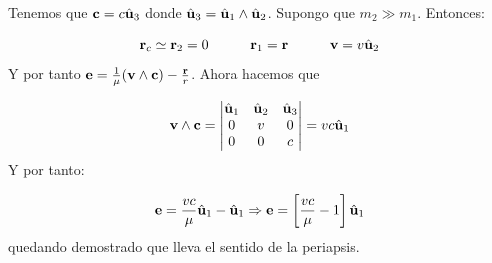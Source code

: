 \begin{texercise}
	Tenemos que $\mathbf{c}=c\hat{\mathbf{u}}_3$ donde $\hat{\mathbf{u}}_3=\hat{\mathbf{u}}_1\wedge\hat{\mathbf{u}}_2$. Supongo que $m_2\gg m_1$. Entonces:

	\begin{equation}
		\mathbf{r}_c \simeq \mathbf{r}_2 = 0 \quad \quad \quad \mathbf{r}_1 = \mathbf{r} \quad \quad \quad \mathbf{v} = v \hat{\mathbf{u}}_2
	\end{equation}
	Y por tanto $\mathbf{e}=\frac{1}{\mu} (\mathbf{v} \wedge \mathbf{c}) - \frac{\mathbf{r}}{r}$. Ahora hacemos que

	\begin{equation}
		\mathbf{v} \wedge \mathbf{c} = \begin{vmatrix}
			\hat{\mathbf{u}}_1 & \hat{\mathbf{u}}_2 & \hat{\mathbf{u}}_3 \\
			0      & v      & 0      \\
			0      & 0      & c
		\end{vmatrix} = v c \hat{\mathbf{u}}_1
	\end{equation}
	Y por tanto:

	\begin{equation}
		\mathbf{e} = \frac{vc}{\mu} \hat{\mathbf{u}}_1 - \hat{\mathbf{u}}_1 \Rightarrow \mathbf{e} = \left[ \frac{vc}{\mu}-1 \right]\hat{\mathbf{u}}_1
	\end{equation}
	quedando demostrado que lleva el sentido de la periapsis.
\end{texercise}

